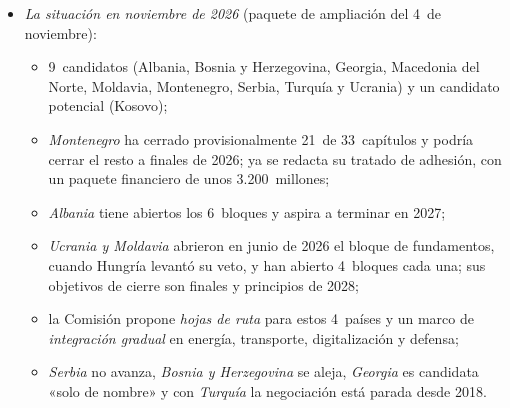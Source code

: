 \documentclass[11pt]{article}
\begin{document}
\begin{itemize}
\begin{itemize}
  \end{itemize}
\item \emph{La situación en noviembre de 2026} (paquete de ampliación del 4~de noviembre)\nocite{CE2026PaqueteAmpliacion}:
  \begin{itemize}
  \item 9~candidatos (Albania, Bosnia y Herzegovina, Georgia, Macedonia del Norte, Moldavia, Montenegro, Serbia, Turquía y Ucrania) y un candidato potencial (Kosovo);
  \item \emph{Montenegro} ha cerrado provisionalmente 21~de 33~capítulos y podría cerrar el resto a finales de 2026; ya se redacta su tratado de adhesión, con un paquete financiero de unos 3.200~millones;
  \item \emph{Albania} tiene abiertos los 6~bloques y aspira a terminar en 2027;
  \item \emph{Ucrania y Moldavia} abrieron en junio de 2026 el bloque de fundamentos, cuando Hungría levantó su veto, y han abierto 4~bloques cada una; sus objetivos de cierre son finales y principios de 2028;
  \item la Comisión propone \emph{hojas de ruta} para estos 4~países y un marco de \emph{integración gradual} en energía, transporte, digitalización y defensa;
  \item \emph{Serbia} no avanza, \emph{Bosnia y Herzegovina} se aleja, \emph{Georgia} es candidata «solo de nombre» y con \emph{Turquía} la negociación está parada desde 2018.
  \end{itemize}
\end{itemize}

\begin{infografia}[H]
\centering
\caption{El proceso de adhesión a la Unión Europea}\label{figu:adhesion}
\end{infografia}
\end{document}
